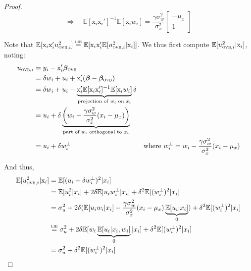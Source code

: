 \documentclass[usletter, 12pt]{article}
\begin{document}
\begin{proof}
				\begin{equation}\label{bias_ovb}
					\Rightarrow \quad
					\mathbb{E}[\text{x}_{i}\text{x}_i']^{-1}\mathbb{E}[\text{x}_{i}w_i] 
					=
					\dfrac{\gamma\sigma_{w}^{2}}{\sigma_{x}^{2}}
					\begin{bmatrix}
				    		- \mu_{x} \\
						1
					\end{bmatrix} 
				\end{equation}
				
				Note that $\mathbb{E}[\text{x}_{i}\text{x}_{i}'u_{\textsc{ovb}, i}^{2}] \overset{\textsc{lie}}{=} \mathbb{E}[\text{x}_{i}\text{x}_{i}'\mathbb{E}[u_{\textsc{ovb}, i}^{2} | \text{x}_{i}]]$. We thus first compute $\mathbb{E}[u_{\textsc{ovb}, i}^{2} | \text{x}_{i}]$, noting:
				~
				\begin{align*}
            				u_{\textsc{ovb}, i} & =  y_i - \text{x}_i'\bm{\beta}_{\textsc{ovb}} \\
            					& = \delta w_{i} + u_i + \text{x}_i' (\bm{\beta} - \bm{\beta}_{\textsc{ovb}})\\
            					& = \delta w_{i} + u_i - \underbrace{\text{x}_{i}' \mathbb{E}[\text{x}_{i}\text{x}_{i}']^{-1} \mathbb{E}[\text{x}_{i}w_{i}]}_{\text{projection of $w_i$ on $x_i$}} \delta\\
            					& =  u_i + \delta \underbrace{\left(w_{i} - \dfrac{\gamma\sigma_{w}^{2}}{\sigma_{x}^{2}} (x_{i} - \mu_{x})\right)}_{\text{part of $w_i$ orthogonal to $x_i$}}\\
						& = u_i + \delta w_{i}^{\perp} & \text{where } w_{i}^{\perp} = w_{i} - \dfrac{\gamma\sigma_{w}^{2}}{\sigma_{x}^{2}} (x_{i} - \mu_{x})
				\end{align*}
				
				And thus,
				\begin{align*}
            				\mathbb{E}[u_{\textsc{ovb}, i}^{2} | \text{x}_{i}] & = \mathbb{E}[(u_i + \delta w_{i}^{\perp})^{2}| x_{i}]\\
					& = \mathbb{E}[u_{i}^{2} | x_{i}] + 2\delta \mathbb{E}[u_{i}w_{i}^{\perp} | x_{i}] + \delta^{2}\mathbb{E}[(w_{i}^{\perp})^{2} | x_{i}]\\
					& = \sigma_{u}^{2} + 2\delta ( \mathbb{E}[u_{i}w_{i} | x_{i}] -  \dfrac{\gamma\sigma_{w}^{2}}{\sigma_{x}^{2}} (x_{i} - \mu_{x})\underbrace{\mathbb{E}[u_{i}|x_{i}]}_{0} ) + \delta^{2}\mathbb{E}[(w_{i}^{\perp})^{2} | x_{i}]\\
					& \overset{\textsc{lie}}{=} \sigma_{u}^{2} + 2\delta \mathbb{E}[w_{i} \underbrace{\mathbb{E}[u_{i} | x_{i}, w_{i}]}_{0} | x_{i}] + \delta^{2}\mathbb{E}[(w_{i}^{\perp})^{2} | x_{i}]\\
					& = \sigma_{u}^{2} +  \delta^{2}\mathbb{E}[(w_{i}^{\perp})^{2} | x_{i}]
				\end{align*}
				

\end{proof}
\end{document}
